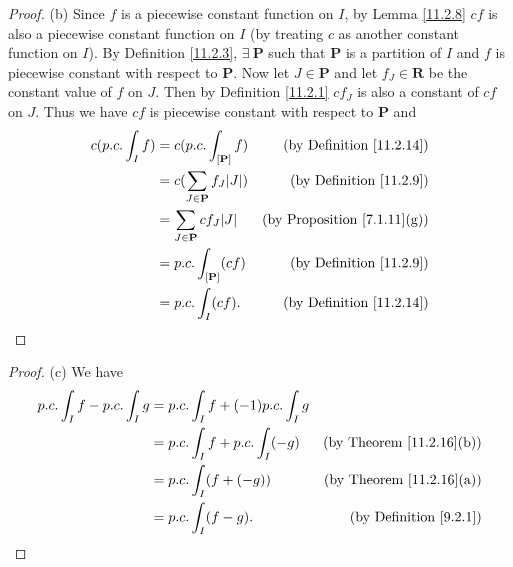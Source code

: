 \begin{proof}{(b)}
    Since \(f\) is a piecewise constant function on \(I\), by Lemma \ref{11.2.8} \(cf\) is also a piecewise constant function on \(I\) (by treating \(c\) as another constant function on \(I\)).
    By Definition \ref{11.2.3}, \(\exists\ \mathbf{P}\) such that \(\mathbf{P}\) is a partition of \(I\) and \(f\) is piecewise constant with respect to \(\mathbf{P}\).
    Now let \(J \in \mathbf{P}\) and let \(f_J \in \mathbf{R}\) be the constant value of \(f\) on \(J\).
    Then by Definition \ref{11.2.1} \(c f_J\) is also a constant of \(cf\) on \(J\).
    Thus we have \(cf\) is piecewise constant with respect to \(\mathbf{P}\) and
    \begin{align*}
        c (p.c. \int_I f) & = c (p.c. \int_{[\mathbf{P}]} f)           & \text{(by Definition \ref{11.2.14})}    \\
                          & = c (\sum_{J \in \mathbf{P}} f_J \abs*{J}) & \text{(by Definition \ref{11.2.9})}     \\
                          & = \sum_{J \in \mathbf{P}} c f_J \abs*{J}   & \text{(by Proposition \ref{7.1.11}(g))} \\
                          & = p.c. \int_{[\mathbf{P}]} (c f)           & \text{(by Definition \ref{11.2.9})}     \\
                          & = p.c. \int_I (c f).                       & \text{(by Definition \ref{11.2.14})}
    \end{align*}
\end{proof}

\begin{proof}{(c)}
    We have
    \begin{align*}
        p.c. \int_I f - p.c. \int_I g & = p.c. \int_I f + (-1) p.c. \int_I g                                        \\
                                      & = p.c. \int_I f + p.c. \int_I (-g)   & \text{(by Theorem \ref{11.2.16}(b))} \\
                                      & = p.c. \int_I (f + (-g))             & \text{(by Theorem \ref{11.2.16}(a))} \\
                                      & = p.c. \int_I (f - g).               & \text{(by Definition \ref{9.2.1})}
    \end{align*}
\end{proof}